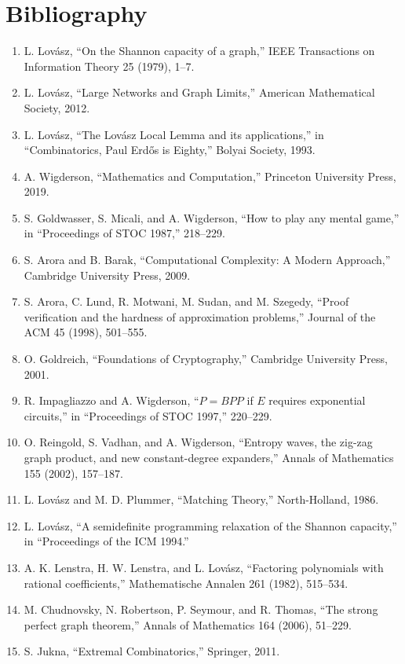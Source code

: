 \section*{Bibliography}
\begin{enumerate}
\item L. Lov\'asz, ``On the Shannon capacity of a graph,'' IEEE Transactions on Information Theory 25 (1979), 1--7.
\item L. Lov\'asz, ``Large Networks and Graph Limits,'' American Mathematical Society, 2012.
\item L. Lov\'asz, ``The Lov\'asz Local Lemma and its applications,'' in ``Combinatorics, Paul Erd\H{o}s is Eighty,'' Bolyai Society, 1993.
\item A. Wigderson, ``Mathematics and Computation,'' Princeton University Press, 2019.
\item S. Goldwasser, S. Micali, and A. Wigderson, ``How to play any mental game,'' in ``Proceedings of STOC 1987,'' 218--229.
\item S. Arora and B. Barak, ``Computational Complexity: A Modern Approach,'' Cambridge University Press, 2009.
\item S. Arora, C. Lund, R. Motwani, M. Sudan, and M. Szegedy, ``Proof verification and the hardness of approximation problems,'' Journal of the ACM 45 (1998), 501--555.
\item O. Goldreich, ``Foundations of Cryptography,'' Cambridge University Press, 2001.
\item R. Impagliazzo and A. Wigderson, ``$P = BPP$ if $E$ requires exponential circuits,'' in ``Proceedings of STOC 1997,'' 220--229.
\item O. Reingold, S. Vadhan, and A. Wigderson, ``Entropy waves, the zig-zag graph product, and new constant-degree expanders,'' Annals of Mathematics 155 (2002), 157--187.
\item L. Lov\'asz and M. D. Plummer, ``Matching Theory,'' North-Holland, 1986.
\item L. Lov\'asz, ``A semidefinite programming relaxation of the Shannon capacity,'' in ``Proceedings of the ICM 1994.''
\item A. K. Lenstra, H. W. Lenstra, and L. Lov\'asz, ``Factoring polynomials with rational coefficients,'' Mathematische Annalen 261 (1982), 515--534.
\item M. Chudnovsky, N. Robertson, P. Seymour, and R. Thomas, ``The strong perfect graph theorem,'' Annals of Mathematics 164 (2006), 51--229.
\item S. Jukna, ``Extremal Combinatorics,'' Springer, 2011.

\end{enumerate}
